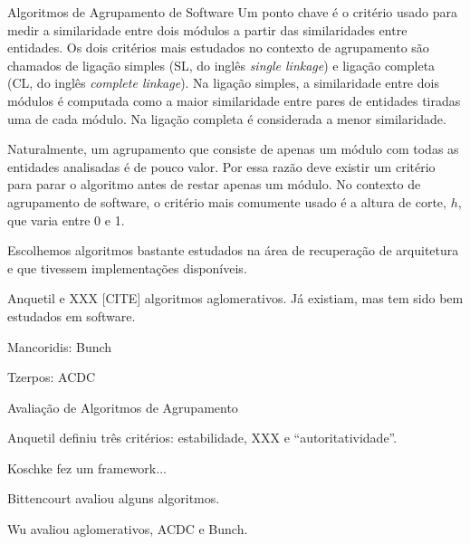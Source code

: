 \begin{section}{Algoritmos de Agrupamento de Software}
Um ponto chave é o critério usado para medir a similaridade entre dois módulos a partir das similaridades entre entidades. Os dois critérios mais estudados no contexto de agrupamento são chamados de ligação simples (SL, do inglês \emph{single linkage}) e ligação completa (CL, do inglês \emph{complete linkage}). Na ligação simples, a similaridade entre dois módulos é computada como a maior similaridade entre pares de entidades tiradas uma de cada módulo. Na ligação completa é considerada a menor similaridade.

Naturalmente, um agrupamento que consiste de apenas um módulo com todas as entidades analisadas é de pouco valor. Por essa razão deve existir um critério para parar o algoritmo antes de restar apenas um módulo. No contexto de agrupamento de software, o critério mais comumente usado é a altura de corte, $h$, que varia entre 0 e 1.


Escolhemos algoritmos bastante estudados na área de recuperação de arquitetura e que tivessem implementações disponíveis.

Anquetil e XXX [CITE] algoritmos aglomerativos. Já existiam, mas tem sido bem estudados em software.

Mancoridis: Bunch

Tzerpos: ACDC
	
\end{section}

\begin{section}{Avaliação de Algoritmos de Agrupamento}

Anquetil definiu três critérios: estabilidade, XXX e ``autoritatividade''.

Koschke fez um framework...

Bittencourt avaliou alguns algoritmos.

Wu avaliou aglomerativos, ACDC e Bunch.



\end{section}


